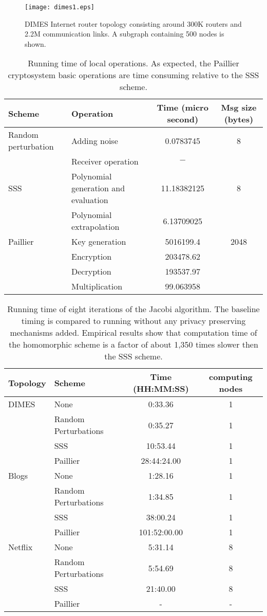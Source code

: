 \documentclass[times, 10pt,twocolumn]{article}
\begin{document}
\begin{figure}
\texttt{[image: dimes1.eps]}\\
  \caption{DIMES Internet router topology consisting around 300K routers and 2.2M communication links. A subgraph containing 500 nodes is shown.}\label{dimes}
\end{figure}

\begin{table*}[t!]
  \centering
\begin{tabular}{|l|l|c|c|}
\hline
  Scheme & Operation & Time (micro second) & Msg size (bytes)\\ \hline
  Random perturbation & Adding noise & 0.0783745  & 8\\
                     & Receiver operation & $-$ &\\ \hline
  SSS & Polynomial generation and evaluation & 11.18382125 & 8 \\
          & Polynomial extrapolation & 6.13709025 & \\ \hline
  Paillier & Key generation & 5016199.4 & 2048\\
      & Encryption & 203478.62  &\\
 & Decryption & 193537.97   &\\
        & Multiplication & 99.063958 & \\
   \hline
\end{tabular}
  \label{local}
  \caption{Running time of local operations. As expected, the Paillier cryptosystem basic operations
  are time consuming relative to the SSS scheme.}\label{rt}
\end{table*}

\begin{table*}
  \centering
\begin{tabular}{|l|l|c|c|}
\hline
  Topology & Scheme & Time (HH:MM:SS) & computing nodes\\ \hline
  DIMES & None & 0:33.36 & 1\\
  & Random Perturbations & 0:35.27 & 1\\
         & SSS & 10:53.44 & 1\\
          & Paillier & 28:44:24.00 & 1\\ \hline
  Blogs & None & 1:28.16 & 1\\
        & Random Perturbations & 1:34.85 & 1\\
         & SSS & 38:00.24 & 1\\
          & Paillier & 101:52:00.00 & 1\\ \hline
  Netflix & None & 5:31.14 & 8\\
  & Random Perturbations & 5:54.69 & 8\\
         & SSS & 21:40.00 & 8 \\
          & Paillier & - & -\\
   \hline
\end{tabular}
  \caption{Running time of eight iterations of the Jacobi algorithm. The baseline timing is compared to running without
  any privacy preserving mechanisms added. Empirical results show that computation time of the homomorphic scheme is a factor of about 1,350 times slower
  then the SSS scheme.}\label{rt}
\end{table*}
\end{document}

